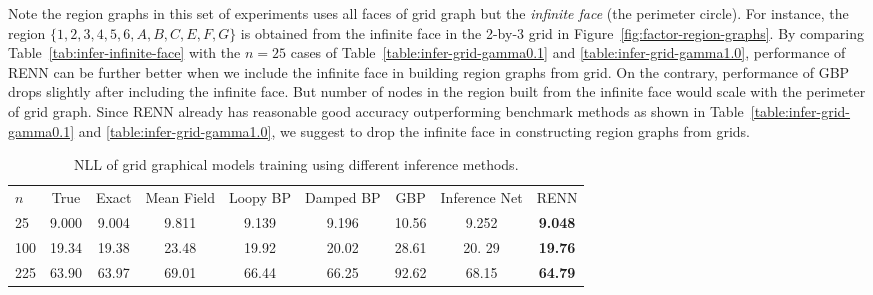 Note the region graphs in this set of experiments uses all faces of grid graph but the \textit{infinite face} (the perimeter circle). {For instance, the region $\{1, 2, 3, 4, 5, 6, A, B, C ,E, F, G\}$ is obtained from the infinite face in the 2-by-3 grid in Figure~\ref{fig:factor-region-graphs}}. By comparing Table~\ref{tab:infer-infinite-face} with the $n=25$ cases of Table~\ref{table:infer-grid-gamma0.1} and \ref{table:infer-grid-gamma1.0}, performance of RENN can be further better when we include the infinite face in building region graphs from grid. On the contrary, performance of GBP drops slightly after including the infinite face. But number of nodes in the region built from the infinite face would scale with the perimeter of grid graph. Since RENN already has reasonable good accuracy outperforming benchmark methods as shown in Table~\ref{table:infer-grid-gamma0.1} and \ref{table:infer-grid-gamma1.0}, we suggest to drop the infinite face in constructing region graphs from grids.


\begin{table*}[t]
  \caption{NLL of grid graphical models training using different inference methods.}
  \label{tab:nll-training-grid-n5n10}
  \begin{center}
    \begin{small}
      
        \begin{tabular}{lcccccccc}
          \toprule
          $n$ & True & Exact & Mean Field & Loopy BP & Damped BP & GBP & Inference Net & RENN \\
          25  &  9.000  &  9.004  &  9.811  &  {9.139}  &  9.196  &  10.56  &  9.252  &  \textbf{9.048}  \\
          100 &  19.34  &  19.38  &  23.48  &  {19.92}  &  20.02  &  28.61  &  20. 29  &  \textbf{19.76} \\
          225 &  63.90  &  63.97  &  69.01  &  66.44    &  66.25  &  92.62  &  68.15  &  \textbf{64.79}  \\
          \bottomrule
        \end{tabular}
      
    \end{small}
  \end{center}
  \vskip -0.3in
\end{table*}


